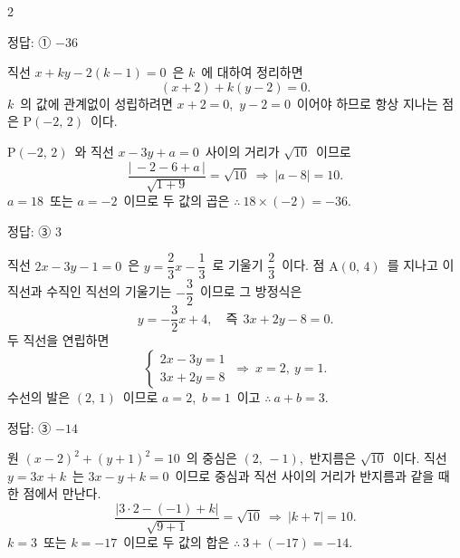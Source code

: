 \documentclass[10pt,fleqn]{article}
\begin{document}
\begin{multicols*}{2}
\begin{dmanswerbox}
정답: ① $-36$
\end{dmanswerbox}

직선 $x + ky - 2(k-1) = 0$\ 은 $k$\ 에 대하여 정리하면
\[ (x + 2) + k(y - 2) = 0. \]
$k$\ 의 값에 관계없이 성립하려면 $x + 2 = 0$,\ $y - 2 = 0$\ 이어야 하므로 항상 지나는 점은 $\mathrm{P}(-2,\,2)$\ 이다.

$\mathrm{P}(-2,\,2)$\ 와 직선 $x - 3y + a = 0$\ 사이의 거리가 $\sqrt{10}$\ 이므로
\[ \dfrac{|\,-2 - 6 + a\,|}{\sqrt{1 + 9}} = \sqrt{10}\ \Longrightarrow\ |a - 8| = 10. \]
$a = 18$\ 또는 $a = -2$\ 이므로 두 값의 곱은 $\therefore\ 18 \times (-2) = -36$.

\begin{dmanswerbox}
정답: ③ $3$
\end{dmanswerbox}

직선 $2x - 3y - 1 = 0$\ 은 $y = \dfrac{2}{3}x - \dfrac{1}{3}$\ 로 기울기 $\dfrac{2}{3}$\ 이다. 점 $\mathrm{A}(0,\,4)$\ 를 지나고 이 직선과 수직인 직선의 기울기는 $-\dfrac{3}{2}$\ 이므로 그 방정식은
\[ y = -\dfrac{3}{2}x + 4,\quad \text{즉}\ \ 3x + 2y - 8 = 0. \]
두 직선을 연립하면
\[ \begin{cases} 2x - 3y = 1 \\ 3x + 2y = 8 \end{cases} \ \Longrightarrow\ x = 2,\ y = 1. \]
수선의 발은 $(2,\,1)$\ 이므로 $a = 2$,\ $b = 1$\ 이고 $\therefore\ a + b = 3$.

\begin{dmanswerbox}
정답: ③ $-14$
\end{dmanswerbox}

원 $(x-2)^2 + (y+1)^2 = 10$\ 의 중심은 $(2,\,-1)$,\ 반지름은 $\sqrt{10}$\ 이다. 직선 $y = 3x + k$\ 는 $3x - y + k = 0$\ 이므로 중심과 직선 사이의 거리가 반지름과 같을 때 한 점에서 만난다.
\[ \dfrac{|3 \cdot 2 - (-1) + k|}{\sqrt{9 + 1}} = \sqrt{10}\ \Longrightarrow\ |k + 7| = 10. \]
$k = 3$\ 또는 $k = -17$\ 이므로 두 값의 합은 $\therefore\ 3 + (-17) = -14$.


\end{multicols*}
\end{document}
